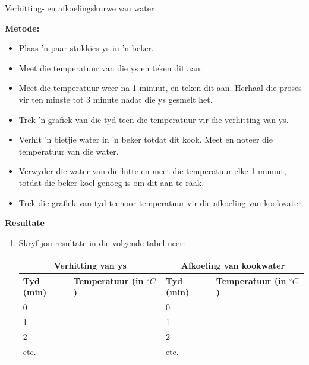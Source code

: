 \begin{f_experiment}{Verhitting- en afkoelingskurwe van water}
{\label{m38736*eip-862}\noindent{}\textbf{Metode:}
\label{m38736*id9872}\begin{itemize}[noitemsep]
            \item Plaas 'n paar stukkies ys in 'n beker.
\item Meet die temperatuur van die ys en teken dit aan.
\item Meet die temperatuur weer na 1 minuut, en teken dit aan. Herhaal die proses vir ten minste tot 3 minute nadat die ys gesmelt het.
\item Trek 'n grafiek van die tyd teen die temperatuur vir die verhitting van ys. 
\item Verhit 'n bietjie water in 'n beker totdat dit kook. Meet en noteer die temperatuur van die water.
\item Verwyder die water van die hitte en meet die temperatuur elke 1 minuut, totdat die beker koel genoeg is om dit aan te raak.
\item Trek die grafiek van tyd teenoor temperatuur vir die afkoeling van kookwater. 
\end{itemize}
\label{m38736*eip-282}
	\par 
      \label{m38736*eip-863}\noindent{}\textbf{Resultate} \\
\begin{enumerate}[noitemsep, label=\textbf{\arabic*}.]
\item Skryf jou resultate in die volgende tabel neer: \\
          \begin{table}[H]
        \begin{center}
      \label{m38736*uid434}
    \noindent
      \begin{tabular}{|l|l|l|l|}\hline
\multicolumn{2}{|c|}{Verhitting van ys} & \multicolumn{2}{|c|}{Afkoeling van kookwater}  \\ \hline
 \textbf{Tyd (min)} & \textbf{Temperatuur (in $^{\circ} C$)} &  \textbf{Tyd (min)} & \textbf{Temperatuur (in $^{\circ} C$)} \\ \hline
     0    & & 0    & \\ \hline 
     1    & & 1    & \\ \hline
     2    & & 2    & \\ \hline
     etc. & & etc. & \\ \hline

\end{tabular}
\end{center}
\end{table}
\end{enumerate}}
\end{f_experiment}
